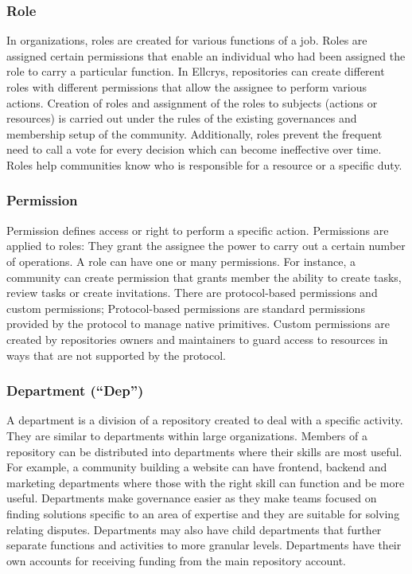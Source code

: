 \subsubsection{Role}
In organizations, roles are created for various functions of a job. Roles are assigned certain permissions that enable an individual who had been assigned the role to carry a particular function. In Ellcrys, repositories can create different roles with different permissions that allow the assignee to perform various actions. Creation of roles and assignment of the roles to subjects (actions or resources) is carried out under the rules of the existing governances and membership setup of the community. Additionally, roles prevent the frequent need to call a vote for every decision which can become ineffective over time. Roles help communities know who is responsible for a resource or a specific duty.

\subsubsection{Permission}
Permission defines access or right to perform a specific action. Permissions are applied to roles: They grant the assignee the power to carry out a certain number of operations. A role can have one or many permissions. For instance, a community can create permission that grants member the ability to create tasks, review tasks or create invitations. There are protocol-based permissions and custom permissions; Protocol-based permissions are standard permissions provided by the protocol to manage native primitives. Custom permissions are created by repositories owners and maintainers to guard access to resources in ways that are not supported by the protocol.


\subsubsection{Department (“Dep”)}
A department is a division of a repository created to deal with a specific activity. They are similar to departments within large organizations. Members of a repository can be distributed into departments where their skills are most useful. For example, a community building a website can have frontend, backend and marketing departments where those with the right skill can function and be more useful. Departments make governance easier as they make teams focused on finding solutions specific to an area of expertise and they are suitable for solving relating disputes. Departments may also have child departments that further separate functions and activities to more granular levels. Departments have their own accounts for receiving funding from the main repository account.


